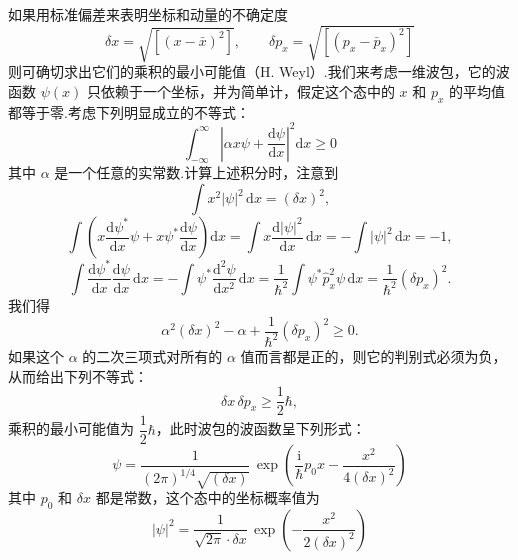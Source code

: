 如果用标准偏差来表明坐标和动量的不确定度
\begin{equation*}
  \delta x=\sqrt{\left[(x-\bar{x})^{2}\right]},\qquad
  \delta p_x=\sqrt{\left[(p_x-\bar{p}_x)^{2}\right]}
\end{equation*}
则可确切求出它们的乘积的最小可能值（H. Weyl）.我们来考虑一维波包，它的波函数 $\psi(x)$ 只依赖于一个坐标，并为简单计，假定这个态中的 $x$ 和 $p_x$ 的平均值都等于零.考虑下列明显成立的不等式：
\begin{equation*}
  \int_{-\infty}^{\infty}\left|\alpha x\psi+\frac{\mathrm{d}\psi}{\mathrm{d}x}\right|^{2}
  \mathrm{d}x\geqslant0
\end{equation*}
其中 $\alpha$ 是一个任意的实常数.计算上述积分时，注意到
\begin{equation*}
  \int x^{2}|\psi|^{2}\,\mathrm{d}x=(\delta x)^{2},
\end{equation*}
\begin{equation*}
  \int\left(x\frac{\mathrm{d}\psi^{*}}{\mathrm{d}x}\psi
  +x\psi^{*}\frac{\mathrm{d}\psi}{\mathrm{d}x}\right)\mathrm{d}x
  =\int x\frac{\mathrm{d}|\psi|^{2}}{\mathrm{d}x}\,\mathrm{d}x
  =-\int|\psi|^{2}\,\mathrm{d}x=-1,
\end{equation*}
\begin{equation*}
  \int\frac{\mathrm{d}\psi^{*}}{\mathrm{d}x}\frac{\mathrm{d}\psi}{\mathrm{d}x}\,\mathrm{d}x
  =-\int\psi^{*}\frac{\mathrm{d}^{2}\psi}{\mathrm{d}x^{2}}\,\mathrm{d}x
  =\frac{1}{\hbar^{2}}\int\psi^{*}\hat{p}_x^{2}\psi\,\mathrm{d}x
  =\frac{1}{\hbar^{2}}(\delta p_x)^{2}.
\end{equation*}
我们得
\begin{equation*}
  \alpha^{2}(\delta x)^{2}-\alpha
  +\frac{1}{\hbar^{2}}(\delta p_x)^{2}\geqslant0.
\end{equation*}
如果这个 $\alpha$ 的二次三项式对所有的 $\alpha$ 值而言都是正的，则它的判别式必须为负，从而给出下列不等式：
\begin{equation}
  \delta x\,\delta p_x\geqslant\frac{1}{2}\hbar,
\end{equation}
乘积的最小可能值为 $\dfrac{1}{2}\hbar$，此时波包的波函数呈下列形式：
\begin{equation}
  \psi=\frac{1}{(2\pi)^{1/4}\sqrt{\left(\delta x\right)}}\,
  \exp\left(\frac{\mathrm{i}}{\hbar}p_0x-\frac{x^{2}}{4(\delta x)^{2}}\right)
\end{equation}
其中 $p_0$ 和 $\delta x$ 都是常数，这个态中的坐标概率值为
\begin{equation*}
  |\psi|^{2}=\frac{1}{\sqrt{2\pi}\cdot\delta x}\,
  \exp\left(-\frac{x^{2}}{2(\delta x)^{2}}\right)
\end{equation*}
